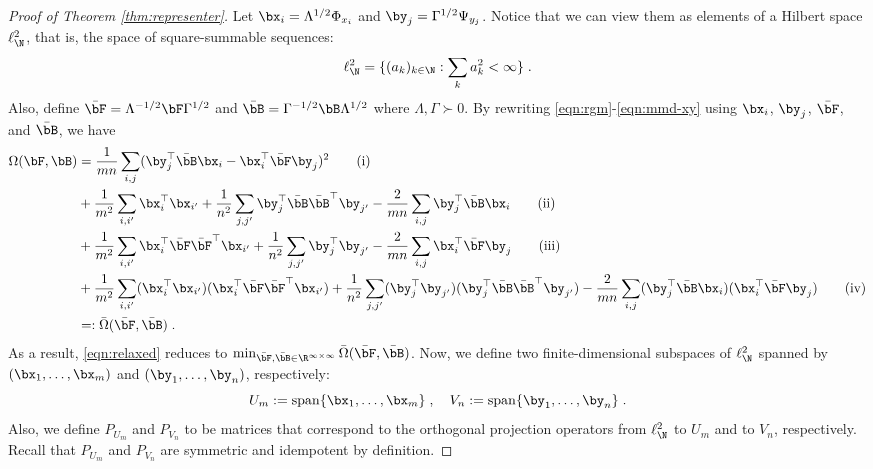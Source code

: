 \documentclass[11pt]{article}
\begin{document}
\begin{proof}[Proof of Theorem \ref{thm:representer}]
	Let $\bx_i = \Lambda^{1 / 2} \Phi_{x_i}$ and $\by_j = \Gamma^{1 / 2} \Psi_{y_j}$. Notice that we can view them as elements of a Hilbert space $\ell^2_{\N}$, that is, the space of square-summable sequences: 
	\begin{equation*}
		\ell^2_{\N} = \{ (a_k)_{k \in \N} : \sum_{k} a_k^2 < \infty \} \;.
	\end{equation*}
	Also, define $\bar{\bF} = \Lambda^{- 1 / 2} \bF \Gamma^{1 / 2} $ and $\bar{\bB} = \Gamma^{- 1 / 2} \bB \Lambda^{1 / 2}$ where $\Lambda, \Gamma \succ 0$. By rewriting \eqref{eqn:rgm}-\eqref{eqn:mmd-xy} using $\bx_i$, $\by_j$, $\bar{\bF}$, and $\bar{\bB}$, we have
	\begin{align*}
		\Omega(\bF, \bB)
		& = \frac{1}{mn} \sum_{i, j} (\by_j^\top \bar{\bB} \bx_i - \bx_i^\top \bar{\bF} \by_j)^2 \tag{i} \\
		& + \frac{1}{m^2} \sum_{i, i'} \bx_i^\top \bx_{i'} + \frac{1}{n^2} \sum_{j, j'} \by_{j}^\top \bar{\bB} \bar{\bB}^\top \by_{j'} - \frac{2}{m n} \sum_{i, j} \by_j^\top \bar{\bB} \bx_i \tag{ii} \\
		& + \frac{1}{m^2} \sum_{i, i'} \bx_i^\top \bar{\bF} \bar{\bF}^\top \bx_{i'} + \frac{1}{n^2} \sum_{j, j'} \by_j^\top \by_{j'} - \frac{2}{m n} \sum_{i, j} \bx_i^\top \bar{\bF} \by_j \tag{iii} \\
		& + \frac{1}{m^2} \sum_{i, i'} (\bx_i^\top \bx_{i'}) (\bx_i^\top \bar{\bF} \bar{\bF}^\top \bx_{i'}) + \frac{1}{n^2} \sum_{j, j'} (\by_j^\top \by_{j'}) (\by_{j}^\top \bar{\bB} \bar{\bB}^\top \by_{j'}) - \frac{2}{m n} \sum_{i, j} (\by_j^\top \bar{\bB} \bx_i) (\bx_i^\top \bar{\bF} \by_j) \tag{iv} \\
		& =: \bar{\Omega}(\bar{\bF}, \bar{\bB}) \;.
	\end{align*}
	As a result, \eqref{eqn:relaxed} reduces to $\min_{\bar{\bF}, \bar{\bB} \in \R^{\infty \times \infty}} \bar{\Omega}(\bar{\bF}, \bar{\bB})$.	Now, we define two finite-dimensional subspaces of $\ell^2_{\N}$ spanned by $(\bx_1, \ldots, \bx_m)$ and $(\by_1, \ldots, \by_n)$, respectively: 
	\begin{equation*}
		U_m := \mathrm{span}\{\bx_1, \ldots, \bx_m\} \;, \quad 
		V_n := \mathrm{span}\{\by_1, \ldots, \by_n\} \;.
	\end{equation*}
	Also, we define $P_{U_m}$ and $P_{V_n}$ to be matrices that correspond to the orthogonal projection operators from $\ell^2_{\N}$ to $U_m$ and to $V_n$, respectively. Recall that $P_{U_m}$ and $P_{V_n}$ are symmetric and idempotent by definition.


\end{proof}
\end{document}
